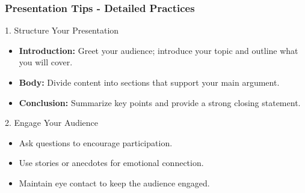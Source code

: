 \documentclass[aspectratio=169]{beamer}
\begin{document}
\begin{frame}[fragile]
    \frametitle{Presentation Tips - Detailed Practices}
    \begin{block}{1. Structure Your Presentation}
        \begin{itemize}
            \item \textbf{Introduction:} Greet your audience; introduce your topic and outline what you will cover.
            \item \textbf{Body:} Divide content into sections that support your main argument.
            \item \textbf{Conclusion:} Summarize key points and provide a strong closing statement.
        \end{itemize}
    \end{block}

    \begin{block}{2. Engage Your Audience}
        \begin{itemize}
            \item Ask questions to encourage participation.
            \item Use stories or anecdotes for emotional connection.
            \item Maintain eye contact to keep the audience engaged.
        \end{itemize}
    \end{block}
\end{frame}
\end{document}
